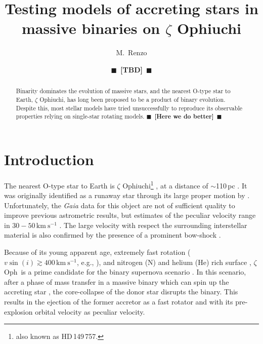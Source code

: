 \documentclass[twocolumn,twocolappendix,trackchanges]{aastex63}
\newcommand{\kms}{{\mathrm{km\ s^{-1}}}}
\newcommand{\zoph}{$\zeta$ Oph}
\newcommand{\todo}[1]{{\large $\blacksquare$~\textbf{\color{red}[#1]}}~$\blacksquare$}
\begin{document}
\graphicspath{{./figures/}}


\title{Testing models of accreting stars in
  massive binaries on $\zeta$ Ophiuchi}
\author[0000-0002-6718-9472]{M.~Renzo}

\author{\todo{TBD}}

\begin{abstract}
  Binarity dominates the evolution of massive stars, and the nearest
  O-type star to Earth, $\zeta$ Ophiuchi, has long been proposed to be
  a product of binary evolution. Despite this, most stellar models
  have tried unsuccessfully to reproduce its observable properties
  relying on single-star rotating models.  \todo{Here we do better}
\end{abstract}

\vspace*{-10pt}


\section{Introduction}
\label{sec:intro}


The nearest O-type star to Earth is $\zeta$ Ophiuchi\footnote{also known
as HD\,149\,757.} \citep[spectral
type O9.5{\rm IVnn},][]{sota:14}, at %
a distance of $\sim$110\,pc \citep[e.g.,][and references
therein]{neuhauser:20}. It was originally identified as a runaway star
through its large proper motion by \cite{blaauw:52}.  Unfortunately,
the \emph{Gaia} data for this object are not of sufficient quality to
improve previous astrometric results, but estimates of the peculiar
velocity range in $30-50\,\kms$
\citep[e.g.,][]{zehe:18, neuhauser:20}. The
large velocity with respect the surrounding interstellar material is
also confirmed by the presence of a prominent bow-shock
\citep[e.g.,][]{bodensteiner:18}.

Because of its young apparent age, extremely fast rotation
($v\sin(i)\gtrsim 400\,\kms$, e.g., \citealt{zehe:18}), and nitrogen
(N) and helium (He) rich surface \citep[e.g.,][]{herrero:92,
  blaauw:93, villamariz:05, marcolino:09}, \zoph\ is a prime candidate
for the binary supernova scenario \citep{blaauw:61, renzo:19walk}. In
this scenario, after a phase of mass transfer in a massive binary
which can spin up the accreting star \citep[e.g.,][]{packet:81}, the
core-collapse of the donor star disrupts the binary. This results in
the ejection of the former accretor as a fast rotator and with its
pre-explosion orbital velocity as peculiar velocity.
\end{document}
